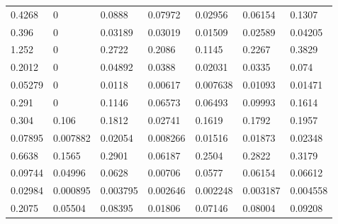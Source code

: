 \documentclass[11pt,a4paper]{article}
\numberwithin{equation}{section}
\begin{document}
\begin{table}[]
\begin{tabular}{lllllll}
0.4268  & 0		   & 0.0888   & 0.07972       & 0.02956      & 0.06154      & 0.1307       \\
0.396   & 0  	   & 0.03189  & 0.03019       & 0.01509      & 0.02589      & 0.04205      \\
1.252   & 0        & 0.2722   & 0.2086        & 0.1145       & 0.2267       & 0.3829       \\
0.2012  & 0        & 0.04892  & 0.0388        & 0.02031      & 0.0335       & 0.074        \\
0.05279 & 0  	   & 0.0118   & 0.00617       & 0.007638     & 0.01093      & 0.01471      \\
0.291   & 0		   & 0.1146   & 0.06573       & 0.06493      & 0.09993      & 0.1614       \\
0.304   & 0.106    & 0.1812   & 0.02741       & 0.1619       & 0.1792       & 0.1957       \\
0.07895 & 0.007882 & 0.02054  & 0.008266      & 0.01516      & 0.01873      & 0.02348      \\
0.6638  & 0.1565   & 0.2901   & 0.06187       & 0.2504       & 0.2822       & 0.3179       \\
0.09744 & 0.04996  & 0.0628   & 0.00706       & 0.0577       & 0.06154      & 0.06612      \\
0.02984 & 0.000895 & 0.003795 & 0.002646      & 0.002248     & 0.003187     & 0.004558     \\
0.2075  & 0.05504  & 0.08395  & 0.01806       & 0.07146      & 0.08004      & 0.09208     
\end{tabular}
\end{table}
\end{document}
